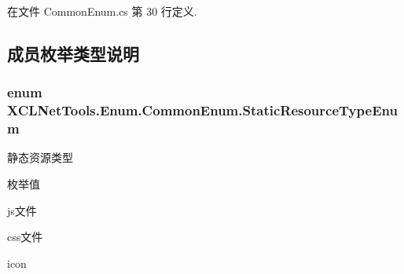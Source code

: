 在文件 Common\-Enum.\-cs 第 30 行定义.



\subsection{成员枚举类型说明}
\hypertarget{class_x_c_l_net_tools_1_1_enum_1_1_common_enum_abe6c6928080288df4a77ec8a59c537d1}{
\subsubsection[{Static\-Resource\-Type\-Enum}]{\setlength{\rightskip}{0pt plus 5cm}enum {\bf X\-C\-L\-Net\-Tools.\-Enum.\-Common\-Enum.\-Static\-Resource\-Type\-Enum}}}\label{class_x_c_l_net_tools_1_1_enum_1_1_common_enum_abe6c6928080288df4a77ec8a59c537d1}


静态资源类型 

\begin{Desc}
\item[枚举值]\par
\begin{description}
\item[{\em 
\hypertarget{class_x_c_l_net_tools_1_1_enum_1_1_common_enum_abe6c6928080288df4a77ec8a59c537d1a5bc06f5800d415cc95e1349edbaca425}{J\-S}\label{class_x_c_l_net_tools_1_1_enum_1_1_common_enum_abe6c6928080288df4a77ec8a59c537d1a5bc06f5800d415cc95e1349edbaca425}
}]js文件 \item[{\em 
\hypertarget{class_x_c_l_net_tools_1_1_enum_1_1_common_enum_abe6c6928080288df4a77ec8a59c537d1a2c56c360580420d293172f42d85dfbed}{C\-S\-S}\label{class_x_c_l_net_tools_1_1_enum_1_1_common_enum_abe6c6928080288df4a77ec8a59c537d1a2c56c360580420d293172f42d85dfbed}
}]css文件 \item[{\em 
\hypertarget{class_x_c_l_net_tools_1_1_enum_1_1_common_enum_abe6c6928080288df4a77ec8a59c537d1add912956b69fb3e570820021206968a3}{I\-C\-O\-N}\label{class_x_c_l_net_tools_1_1_enum_1_1_common_enum_abe6c6928080288df4a77ec8a59c537d1add912956b69fb3e570820021206968a3}
}]icon \end{description}
\end{Desc}


